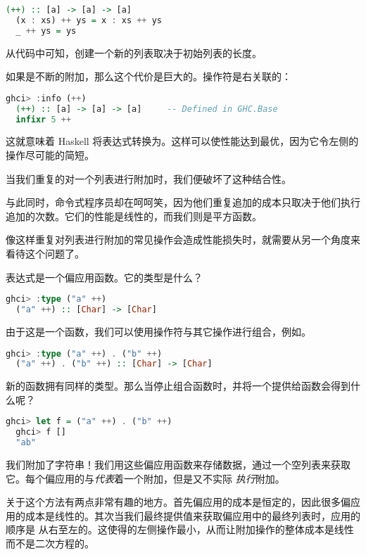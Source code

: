 \documentclass[./main.tex]{subfiles}
\begin{document}
\begin{lstlisting}[language=Haskell]
  (++) :: [a] -> [a] -> [a]
  (x : xs) ++ ys = x : xs ++ ys
  _ ++ ys = ys
\end{lstlisting}

从代码中可知，创建一个新的列表取决于初始列表的长度。

如果是不断的附加，那么这个代价是巨大的。\acode{(++)}操作符是右关联的：

\begin{lstlisting}[language=Haskell]
  ghci> :info (++)
  (++) :: [a] -> [a] -> [a] 	-- Defined in GHC.Base
  infixr 5 ++
\end{lstlisting}

这就意味着 Haskell 将表达式转换为。这样可以使性能达到最优，因为它令左侧的操作尽可能的简短。

当我们重复的对一个列表进行附加时，我们便破坏了这种结合性。

与此同时，命令式程序员却在呵呵笑，因为他们重复追加的成本只取决于他们执行追加的次数。它们的性能是线性的，而我们则是平方函数。

像这样重复对列表进行附加的常见操作会造成性能损失时，就需要从另一个角度来看待这个问题了。

表达式是一个偏应用函数。它的类型是什么？

\begin{lstlisting}[language=Haskell]
  ghci> :type ("a" ++)
  ("a" ++) :: [Char] -> [Char]
\end{lstlisting}

由于这是一个函数，我们可以使用操作符与其它操作进行组合，例如。

\begin{lstlisting}[language=Haskell]
  ghci> :type ("a" ++) . ("b" ++)
  ("a" ++) . ("b" ++) :: [Char] -> [Char]
\end{lstlisting}

新的函数拥有同样的类型。那么当停止组合函数时，并将一个提供给函数会得到什么呢？

\begin{lstlisting}[language=Haskell]
  ghci> let f = ("a" ++) . ("b" ++)
  ghci> f []
  "ab"
\end{lstlisting}

我们附加了字符串！我们用这些偏应用函数来存储数据，通过一个空列表来获取它。每个偏应用的\acode{(++)}与\textit{代表}着一个附加，但是又不实际
\textit{执行}附加。

关于这个方法有两点非常有趣的地方。首先偏应用的成本是恒定的，因此很多偏应用的成本是线性的。其次当我们最终提供\acode{[]}值来获取偏应用中的最终列表时，应用的顺序是
从右至左的。这使得\acode{(++)}的左侧操作最小，从而让附加操作的整体成本是线性而不是二次方程的。
\end{document}
